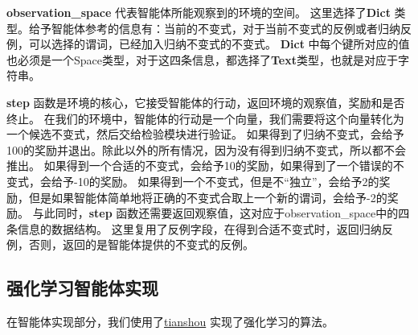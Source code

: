 \textbf{observation\_space} 代表智能体所能观察到的环境的空间。
这里选择了\textbf{Dict} 类型。给予智能体参考的信息有：当前的不变式，对于当前不变式的反例或者归纳反例，可以选择的谓词，已经加入归纳不变式的不变式。
\textbf{Dict} 中每个键所对应的值也必须是一个Space类型，对于这四条信息，都选择了\textbf{Text}类型，也就是对应于字符串。

\textbf{step} 函数是环境的核心，它接受智能体的行动，返回环境的观察值，奖励和是否终止。
在我们的环境中，智能体的行动是一个向量，我们需要将这个向量转化为一个候选不变式，然后交给检验模块进行验证。
如果得到了归纳不变式，会给予100的奖励并退出。除此以外的所有情况，因为没有得到归纳不变式，所以都不会推出。
如果得到一个合适的不变式，会给予10的奖励，如果得到了一个错误的不变式，会给予-10的奖励。
如果得到一个不变式，但是不“独立”，会给予2的奖励，但是如果智能体简单地将正确的不变式合取上一个新的谓词，会给予-2的奖励。
与此同时，\textbf{step} 函数还需要返回观察值，这对应于observation\_space中的四条信息的数据结构。
这里复用了反例字段，在得到合适不变式时，返回归纳反例，否则，返回的是智能体提供的不变式的反例。

\subsection{强化学习智能体实现}

在智能体实现部分，我们使用了\href{https://tianshou.readthedocs.io/}{tianshou} \cite{tianshou} 实现了强化学习的算法。